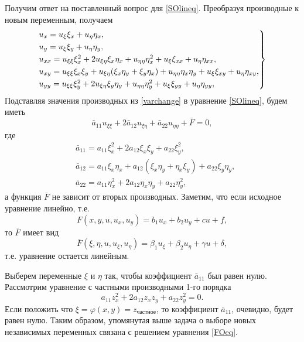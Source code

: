 Получим ответ на поставленный вопрос для \eqref{SOlineq}. Преобразуя производные к новым переменным, получаем
\begin{equation} \label{varchange}
	\begin{rcases}
		u_x = u_{\xi} \xi_{x} + u_{\eta} \eta_{x}, \\
		u_y = u_{\xi} \xi_{y} + u_{\eta} \eta_{y}, \\
		u_{xx} = u_{\xi\xi} \xi_{x}^2 + 2 u_{\xi\eta} \xi_{x} \eta_{x} + u_{\eta\eta} \eta^2_{x} + u_{\xi} \xi_{xx} + u_{\eta} \eta_{xx}, \\
		u_{xy} = u_{\xi\xi} \xi_{x} \xi_{y} + u_{\xi\eta}(\xi_x \eta_y + \xi_y \eta_x) + u_{\eta\eta} \eta_x \eta_y + u_{\xi} \xi_{xy} + u_{\eta} \eta_{xy}, \\
		u_{yy} = u_{\xi\xi} \xi_{y}^2 + 2 u_{\xi\eta} \xi_{y} \eta_{y} + u_{\eta\eta} \eta^2_{y} + u_{\xi} \xi_{yy} + u_{\eta} \eta_{yy},
	\end{rcases}
\end{equation}
Подставляя значения производных из \eqref{varchange} в уравнение \eqref{SOlineq}, будем иметь 
\begin{equation} \label{SOeqCHANGED}
	\bar{a}_{11} u_{\xi\xi} + 2 \bar{a}_{12} u_{\xi\eta} + \bar{a}_{22} u_{\eta\eta} + \bar{F} = 0,
\end{equation}
где 
\begin{align*}
	&\bar{a}_{11} = a_{11} \xi^2_{x} + 2 a_{12} \xi_x \xi_y + a_{22} \xi^2_y, \\
	&\bar{a}_{12} = a_{11} \xi_x \eta_x + a_{12} (\xi_x \eta_y + \eta_x \xi_y) + a_{22} \xi_{y} \eta_{y}, \\
	&\bar{a}_{22} = a_{11} \eta^2_{x} + 2 a_{12} \eta_x \eta_y + a_{22} \eta^2_y,
\end{align*}
а функция $\bar{F}$ не зависит от вторых производных. Заметим, что если исходное уравнение линейно, т.е. 
\begin{equation*}
	F(x, y, u, u_x, u_y) = b_1 u_x + b_2 u_y + c u + f,
\end{equation*}
то $\bar{F}$ имеет вид 
\begin{equation*}
	\bar{F}(\xi, \eta, u, u_{\xi}, u_{\eta}) = \beta_1 u_{\xi} + \beta_2 u_{\eta} + \gamma u + \delta,
\end{equation*}
т.е. уравнение остается линейным. 

Выберем переменные $\xi$ и $\eta$ так, чтобы коэффициент $\bar{a}_{11}$ был равен нулю. Рассмотрим уравнение с частными производными 1-го порядка
\begin{equation} \label{FOeq}
	a_{11} z^2_x + 2 a_{12} z_x z_y + a_{22} z_y^2 = 0.
\end{equation}
Если положить что $\xi = \varphi(x, y) = z_{\text{частное}}$, то коэффициент $\bar{a}_{11}$, очевидно, будет равен нулю. Таким образом, упомянутая выше задача о выборе новых независимых переменных связана с решением уравнения \eqref{FOeq}.  

